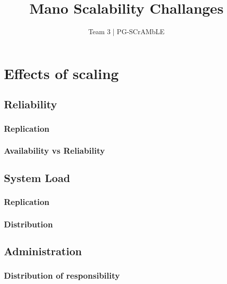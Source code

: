 \documentclass[12pt,twoside,doublepage]{article}
\newcommand{\teilnehmer}{Team 3 | PG-SCrAMbLE}
\newcommand{\ausarbeitung}{Mano Scalability Challanges}
\begin{document}
\title{\ausarbeitung}
\author{\teilnehmer}
\maketitle
\thispagestyle{empty}


%

%
%

\section{Effects of scaling}

\subsection{Reliability}
\subsubsection{Replication}
\subsubsection{Availability vs Reliability}

\subsection{System Load}
\subsubsection{Replication}
\subsubsection{Distribution}

\subsection{Administration}
\subsubsection{Distribution of responsibility}
\end{document}
